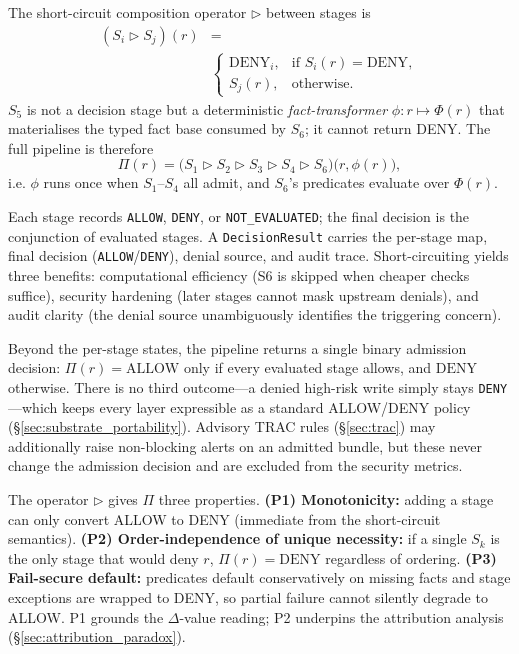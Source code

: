 \documentclass[sigconf,review,anonymous]{acmart}
\begin{document}
The short-circuit composition operator $\rhd$ between stages is
\begin{equation}
\begin{aligned}
(S_i \rhd S_j)(r) &= \\
&\begin{cases}
\text{DENY}_i, & \text{if } S_i(r) = \text{DENY}, \\
S_j(r), & \text{otherwise.}
\end{cases}
\end{aligned}
\label{eq:composition}
\end{equation}
$S_5$ is not a decision stage but a deterministic \emph{fact-transformer} $\phi\!:\!r\!\mapsto\!\Phi(r)$ that materialises the typed fact base consumed by $S_6$; it cannot return DENY. The full pipeline is therefore
\begin{equation}
\Pi(r) = \bigl(S_1 \rhd S_2 \rhd S_3 \rhd S_4 \rhd S_6\bigr)\!\bigl(r,\phi(r)\bigr),
\label{eq:pipeline}
\end{equation}
i.e. $\phi$ runs once when $S_1$--$S_4$ all admit, and $S_6$'s predicates evaluate over $\Phi(r)$.

Each stage records \texttt{ALLOW}, \texttt{DENY}, or \texttt{NOT\_EVALUATED}; the final decision is the conjunction of evaluated stages. A \texttt{DecisionResult} carries the per-stage map, final decision (\texttt{ALLOW}/\texttt{DENY}), denial source, and audit trace. Short-circuiting yields three benefits: computational efficiency (S6 is skipped when cheaper checks suffice), security hardening (later stages cannot mask upstream denials), and audit clarity (the denial source unambiguously identifies the triggering concern).

Beyond the per-stage states, the pipeline returns a single binary admission decision: $\Pi(r)=\text{ALLOW}$ only if every evaluated stage allows, and $\text{DENY}$ otherwise. There is no third outcome---a denied high-risk write simply stays \texttt{DENY}---which keeps every layer expressible as a standard ALLOW/DENY policy (\S\ref{sec:substrate_portability}). Advisory TRAC rules (\S\ref{sec:trac}) may additionally raise non-blocking alerts on an admitted bundle, but these never change the admission decision and are excluded from the security metrics.

The operator $\rhd$ gives $\Pi$ three properties. \textbf{(P1) Monotonicity:} adding a stage can only convert ALLOW to DENY (immediate from the short-circuit semantics). \textbf{(P2) Order-independence of unique necessity:} if a single $S_k$ is the only stage that would deny $r$, $\Pi(r)=\mathrm{DENY}$ regardless of ordering. \textbf{(P3) Fail-secure default:} predicates default conservatively on missing facts and stage exceptions are wrapped to DENY, so partial failure cannot silently degrade to ALLOW. P1 grounds the $\Delta$-value reading; P2 underpins the attribution analysis (\S\ref{sec:attribution_paradox}).
\end{document}
